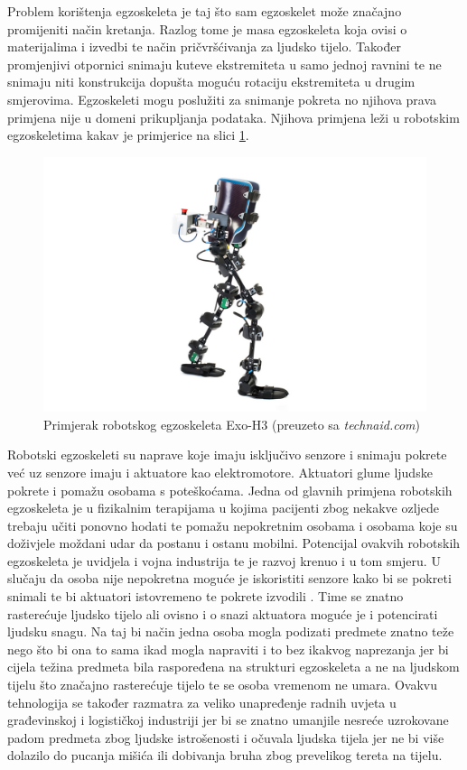 \documentclass[times, utf8, diplomski]{fer}
\begin{document}
Problem korištenja egzoskeleta je taj što sam egzoskelet može značajno promijeniti način kretanja. Razlog tome je masa egzoskeleta
koja ovisi o materijalima i izvedbi te način pričvršćivanja za ljudsko tijelo. Također promjenjivi otpornici snimaju kuteve 
ekstremiteta u samo jednoj ravnini te ne snimaju niti konstrukcija dopušta moguću rotaciju ekstremiteta u drugim smjerovima.
Egzoskeleti mogu poslužiti za snimanje pokreta no njihova prava primjena nije u domeni prikupljanja podataka. Njihova primjena 
leži u robotskim egzoskeletima kakav je primjerice na slici \ref{exoskeleton}.

\begin{figure}
    \includegraphics[width=\textwidth]{exoskeleton.jpg}
    \caption{Primjerak robotskog egzoskeleta Exo-H3 (preuzeto sa \textit{technaid.com})}
    \label{exoskeleton}
\end{figure}

Robotski egzoskeleti su naprave koje imaju isključivo senzore i snimaju pokrete već uz senzore imaju i aktuatore kao elektromotore.
Aktuatori glume ljudske pokrete i pomažu osobama s poteškoćama. Jedna od glavnih primjena robotskih egzoskeleta je u fizikalnim
terapijama u kojima pacijenti zbog nekakve ozljede trebaju učiti ponovno hodati te pomažu nepokretnim osobama i osobama koje su
doživjele moždani udar da postanu i ostanu mobilni. Potencijal ovakvih robotskih egzoskeleta je uvidjela i vojna industrija te
je razvoj krenuo i u tom smjeru. U slučaju da osoba nije nepokretna moguće je iskoristiti senzore kako bi se pokreti snimali te
bi aktuatori istovremeno te pokrete izvodili \citep{exo}. Time se znatno rasterećuje ljudsko tijelo ali ovisno i o snazi aktuatora moguće je i
potencirati ljudsku snagu. Na taj bi način jedna osoba mogla podizati predmete znatno teže nego što bi ona to sama ikad mogla
napraviti i to bez ikakvog naprezanja jer bi cijela težina predmeta bila raspoređena na strukturi egzoskeleta a ne na ljudskom 
tijelu što značajno rasterećuje tijelo te se osoba vremenom ne umara. Ovakvu tehnologija se također razmatra za veliko unapređenje
radnih uvjeta u građevinskoj i logističkoj industriji jer bi se znatno umanjile nesreće uzrokovane padom predmeta zbog ljudske
istrošenosti i očuvala ljudska tijela jer ne bi više dolazilo do pucanja mišića ili dobivanja bruha zbog prevelikog tereta na tijelu.
\end{document}
